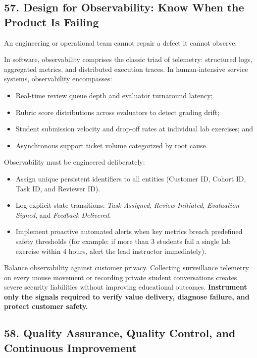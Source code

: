 \subsection*{57. Design for Observability: Know When the Product Is Failing}

An engineering or operational team cannot repair a defect it cannot observe.

In software, observability comprises the classic triad of telemetry: structured logs, aggregated metrics, and distributed execution traces. In human-intensive service systems, observability encompasses:
\begin{itemize}
    \item Real-time review queue depth and evaluator turnaround latency;
    \item Rubric score distributions across evaluators to detect grading drift;
    \item Student submission velocity and drop-off rates at individual lab exercises; and
    \item Asynchronous support ticket volume categorized by root cause.
\end{itemize}

Observability must be engineered deliberately:
\begin{itemize}
    \item Assign unique persistent identifiers to all entities (Customer ID, Cohort ID, Task ID, and Reviewer ID).
    \item Log explicit state transitions: \emph{Task Assigned}, \emph{Review Initiated}, \emph{Evaluation Signed}, and \emph{Feedback Delivered}.
    \item Implement proactive automated alerts when key metrics breach predefined safety thresholds (for example: if more than 3 students fail a single lab exercise within 4 hours, alert the lead instructor immediately).
\end{itemize}

Balance observability against customer privacy. Collecting surveillance telemetry on every mouse movement or recording private student conversations creates severe security liabilities without improving educational outcomes. \textbf{Instrument only the signals required to verify value delivery, diagnose failure, and protect customer safety.}

\subsection*{58. Quality Assurance, Quality Control, and Continuous Improvement}

